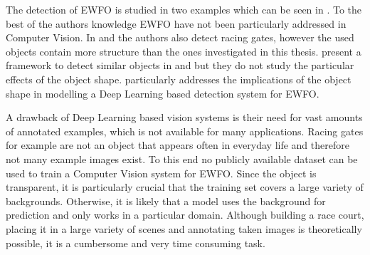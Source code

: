 The detection of \ac{EWFO} is studied in two examples which can be seen in  . To the best of the authors knowledge \ac{EWFO} have not been particularly addressed in Computer Vision. In \cite{Falanga} and \cite{Li2018a} the authors also detect racing gates, however the used objects contain more structure than the ones investigated in this thesis. \citeauthor{Jung2018} present a framework to detect similar objects in \cite{Jung} and \cite{Jung2018} but they do not study the particular effects of the object shape.  particularly addresses the implications of the object shape in modelling a Deep Learning based detection system for \ac{EWFO}.

A drawback of Deep Learning based vision systems is their need for vast amounts of annotated examples, which is not available for many applications. Racing gates for example are not an object that appears often in everyday life and therefore not many example images exist. To this end no publicly available dataset can be used to train a Computer Vision system for \ac{EWFO}. Since the object is transparent, it is particularly crucial that the training set covers a large variety of backgrounds. Otherwise, it is likely that a model uses the background for prediction and only works in a particular domain. Although building a race court, placing it in a large variety of scenes and annotating taken images is theoretically possible, it is a cumbersome and very time consuming task. 

